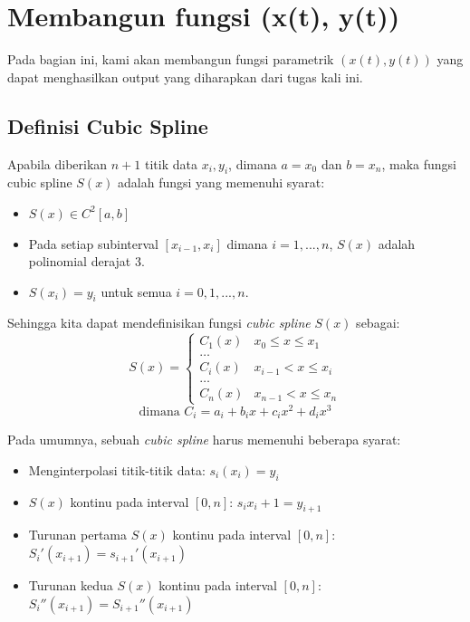 \documentclass[journal,12pt,onecolumn,a4paper]{IEEEtran}
\begin{document}
\pagebreak

\section{Membangun fungsi (x(t), y(t))}
Pada bagian ini, kami akan membangun fungsi parametrik \((x(t), y(t))\) yang dapat menghasilkan output yang diharapkan dari tugas kali ini.

\subsection{Definisi Cubic Spline}
Apabila diberikan \(n + 1\) titik data \(x_i, y_i\), dimana \(a = x_0\) dan \(b = x_n\), maka fungsi cubic spline \(S(x)\) adalah fungsi yang memenuhi syarat:
\begin{itemize}
	\item \(S(x) \in C^2[a, b]\)
	\item Pada setiap subinterval \([x_{i - 1}, x_i]\) dimana \(i = 1, ..., n\), \(S(x)\) adalah polinomial derajat 3.
	\item \(S(x_i) = y_i\) untuk semua \(i = 0, 1, ..., n\).
\end{itemize}

Sehingga kita dapat mendefinisikan fungsi \emph{cubic spline} \(S(x)\) sebagai:
\begin{equation}
	S(x) = \begin{cases}
		C_1(x) & x_0 \leq x \leq x_1  \\
		\dots                         \\
		C_i(x) & x_{i-1} < x \leq x_i \\
		\dots                         \\
		C_n(x) & x_{n-1} < x \leq x_n
	\end{cases}
\end{equation}
\begin{equation}
	\text{dimana }C_i = a_i + b_ix + c_ix^2 + d_ix^3
\end{equation}

Pada umumnya, sebuah \emph{cubic spline} harus memenuhi beberapa syarat:
\begin{itemize}
	\item Menginterpolasi titik-titik data: \(s_i(x_i) = y_i\)
	\item \(S(x)\) kontinu pada interval \([0, n]\): \(s_i{x_i+1} = y_{i + 1}\)
	\item Turunan pertama \(S(x)\) kontinu pada interval \([0, n]\): \(S_i'(x_{i + 1}) = s_{i + 1}'(x_{i + 1})\)
	\item Turunan kedua \(S(x)\) kontinu pada interval \([0, n]\): \(S_i''(x_{i + 1}) = S_{i + 1}''(x_{i + 1})\)
\end{itemize}
\end{document}
